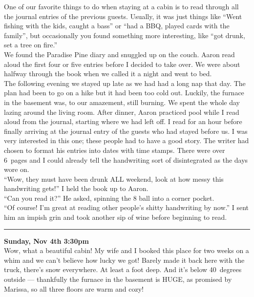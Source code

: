 \documentclass[a5paper]{scrartcl}
\begin{document}
One of our favorite things to do when staying at a cabin is to read through all the journal entries of the previous guests. Usually, it was just things like \enquote{Went fishing with the kids, caught a bass} or \enquote{had a BBQ, played cards with the family}, but occasionally you found something more interesting, like \enquote{got drunk, set a tree on fire.}\\


We found the Paradise Pine diary and snuggled up on the couch. Aaron read aloud the first four or five entries before I decided to take over. We were about halfway through the book when we called it a night and went to bed.\\


The following evening we stayed up late as we had had a long nap that day. The plan had been to go on a hike but it had been too cold out. Luckily, the furnace in the basement was, to our amazement, still burning. We spent the whole day lazing around the living room. After dinner, Aaron practiced pool while I read aloud from the journal, starting where we had left off. I read for an hour before finally arriving at the journal entry of the guests who had stayed before us. I was very interested in this one; these people had to have a good story. 
The writer had chosen to format his entries into dates with time stamps. There were over 6~pages and I could already tell the handwriting sort of disintegrated as the days wore on. \\


\enquote{Wow, they must have been drunk ALL weekend, look at how messy this handwriting gets!} I held the book up to Aaron.\\


\enquote{Can you read it?} He asked, spinning the 8 ball into a corner pocket.\\


\enquote{Of course! I'm great at reading other people's shitty handwriting by now.} I sent him an impish grin and took another sip of wine before beginning to read.\\

\hrule

\textbf{Sunday, Nov 4th   3:30pm}
\\


Wow, what a beautiful cabin! My wife and I booked this place for two weeks on a whim and we can't believe how lucky we got! Barely made it back here with the truck, there's snow everywhere. At least a foot deep. And it's below 40~degrees outside --- thankfully the furnace in the basement is HUGE, as promised by Marissa, so all three floors are warm and cozy!\\
\end{document}
